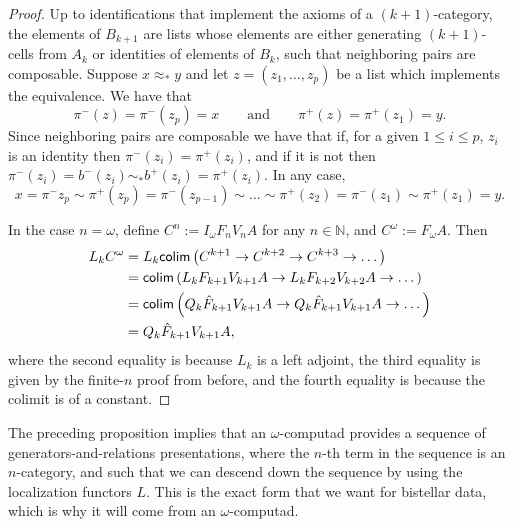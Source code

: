 \documentclass[12pt,a4paper]{article}
\numberwithin{equation}{section}
\begin{document}
\begin{proof}
    Up to identifications that implement the axioms of a $(k+1)$-category, the elements of $B_{k+1}$ are lists whose elements are either generating $(k+1)$-cells from $A_k$ or identities of elements of $B_k$, such that neighboring pairs are composable. Suppose $x \approx_* y$ and let $z = (z_1, \dots, z_p)$ be a list which implements the equivalence. We have that
    \begin{equation}
        \pi^- (z) = \pi^- (z_p) = x \qquad \mathrm{and} \qquad \pi^+ (z) = \pi^+ (z_1) = y.
    \end{equation}
    Since neighboring pairs are composable we have that if, for a given $1 \leq i \leq p$, $z_i$ is an identity then $\pi^- (z_i) = \pi^+(z_i)$, and if it is not then $\pi^-(z_i) = b^-(z_i) \sim_* b^+(z_i) = \pi^+(z_i)$. In any case,
    \begin{equation}
        x = \pi^-{z_p} \sim \pi^+ (z_p) = \pi^-(z_{p-1}) \sim \dots \sim \pi^+(z_2) = \pi^-(z_1) \sim \pi^+(z_1) = y.
    \end{equation}
    
    In the case $n=\omega$, define $C^n := I_\omega F_n V_n A$ for any $n \in \mathbb{N}$, and $C^\omega := F_\omega A$. Then
    \begin{align}
        L_k C^{\omega} &= L_k \mathsf{colim} \left(C^{k+1} \to C^{k+2} \to C^{k+3} \to \dots \right) \notag\\ 
        &= \mathsf{colim} \left( L_k F_{k+1} V_{k+1} A \to L_k F_{k+2} V_{k+2} A  \to \dots \right) \notag\\
        &= \mathsf{colim} \left( Q_k \hat{F}_{k+1} V_{k+1} A \to Q_k \hat{F}_{k+1} V_{k+1} A  \to \dots \right) \notag\\
        &= Q_k \hat{F}_{k+1} V_{k+1} A,
    \end{align}
    where the second equality is because $L_k$ is a left adjoint, the third equality is given by the finite-$n$ proof from before, and the fourth equality is because the colimit is of a constant.
\end{proof}

\begin{remark}
    The preceding proposition implies that an $\omega$-computad provides a sequence of generators-and-relations presentations, where the $n$-th term in the sequence is an $n$-category, and such that we can descend down the sequence by using the localization functors $L$. This is the exact form that we want for bistellar data, which is why it will come from an $\omega$-computad. 
\end{remark}
\end{document}
